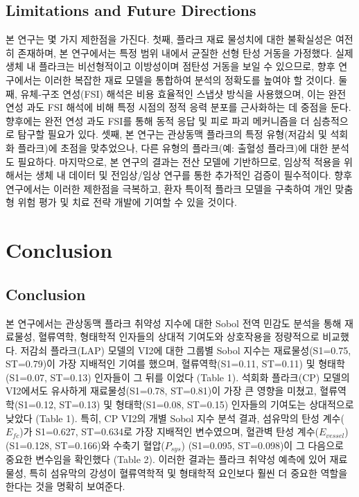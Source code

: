\documentclass[preprint,12pt]{elsarticle}
\begin{document}
\subsection{Limitations and Future Directions}
본 연구는 몇 가지 제한점을 가진다. 첫째, 플라크 재료 물성치에 대한 불확실성은 여전히 존재하며, 본 연구에서는 특정 범위 내에서 균질한 선형 탄성 거동을 가정했다. 실제 생체 내 플라크는 비선형적이고 이방성이며 점탄성 거동을 보일 수 있으므로, 향후 연구에서는 이러한 복잡한 재료 모델을 통합하여 분석의 정확도를 높여야 할 것이다. 둘째, 유체-구조 연성(FSI) 해석은 비용 효율적인 스냅샷 방식을 사용했으며, 이는 완전 연성 과도 FSI 해석에 비해 특정 시점의 정적 응력 분포를 근사화하는 데 중점을 둔다. 향후에는 완전 연성 과도 FSI를 통해 동적 응답 및 피로 파괴 메커니즘을 더 심층적으로 탐구할 필요가 있다. 셋째, 본 연구는 관상동맥 플라크의 특정 유형(저감쇠 및 석회화 플라크)에 초점을 맞추었으나, 다른 유형의 플라크(예: 출혈성 플라크)에 대한 분석도 필요하다. 마지막으로, 본 연구의 결과는 전산 모델에 기반하므로, 임상적 적용을 위해서는 생체 내 데이터 및 전임상/임상 연구를 통한 추가적인 검증이 필수적이다. 향후 연구에서는 이러한 제한점을 극복하고, 환자 특이적 플라크 모델을 구축하여 개인 맞춤형 위험 평가 및 치료 전략 개발에 기여할 수 있을 것이다.

\section{Conclusion}

\subsection{Conclusion}
본 연구에서는 관상동맥 플라크 취약성 지수에 대한 Sobol 전역 민감도 분석을 통해 재료물성, 혈류역학, 형태학적 인자들의 상대적 기여도와 상호작용을 정량적으로 비교했다. 저감쇠 플라크(LAP) 모델의 VI2에 대한 그룹별 Sobol 지수는 재료물성(S1=0.75, ST=0.79)이 가장 지배적인 기여를 했으며, 혈류역학(S1=0.11, ST=0.11) 및 형태학(S1=0.07, ST=0.13) 인자들이 그 뒤를 이었다 (Table 1). 석회화 플라크(CP) 모델의 VI2에서도 유사하게 재료물성(S1=0.78, ST=0.81)이 가장 큰 영향을 미쳤고, 혈류역학(S1=0.12, ST=0.13) 및 형태학(S1=0.08, ST=0.15) 인자들의 기여도는 상대적으로 낮았다 (Table 1). 특히, CP VI2의 개별 Sobol 지수 분석 결과, 섬유막의 탄성 계수($E_{fc}$)가 S1=0.627, ST=0.634로 가장 지배적인 변수였으며, 혈관벽 탄성 계수($E_{vessel}$) (S1=0.128, ST=0.166)와 수축기 혈압($P_{sys}$) (S1=0.095, ST=0.098)이 그 다음으로 중요한 변수임을 확인했다 (Table 2). 이러한 결과는 플라크 취약성 예측에 있어 재료물성, 특히 섬유막의 강성이 혈류역학적 및 형태학적 요인보다 훨씬 더 중요한 역할을 한다는 것을 명확히 보여준다.
\end{document}
